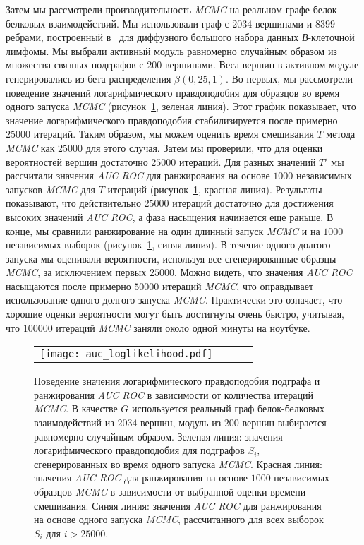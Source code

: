 Затем мы рассмотрели производительность \emph{MCMC} на реальном графе
белок-белковых взаимодействий.  Мы использовали граф с $2034$ вершинами
и $8399$ ребрами, построенный в~\cite{Dittrich2008a} для диффузного большого
набора данных \emph{В}-клеточной лимфомы.  Мы выбрали активный модуль
равномерно случайным образом из множества связных подграфов с $200$ вершинами.
Веса вершин в активном модуле генерировались из бета-распределения $\beta(0,25,
1)$.  Во-первых, мы рассмотрели поведение значений логарифмического
правдоподобия для образцов во время одного запуска \emph{MCMC}
(рисунок~\ref{fig:auclog}, зеленая линия).  Этот график показывает, что
значение логарифмического правдоподобия стабилизируется после примерно $25000$
итераций.  Таким образом, мы можем оценить время смешивания $T$ метода
\emph{MCMC} как $25000$ для этого случая.  Затем мы проверили, что для оценки
вероятностей вершин достаточно $25000$ итераций.  Для разных значений $T'$ мы
рассчитали значения \emph{AUC ROC} для ранжирования на основе $1000$ независимых
запусков \emph{MCMC} для $T$ итераций (рисунок~\ref{fig:auclog}, красная
линия).  Результаты показывают, что действительно $25000$ итераций достаточно
для достижения высоких значений \emph{AUC ROC}, а фаза насыщения начинается еще
раньше.  В конце, мы сравнили ранжирование на один длинный запуск \emph{MCMC}
и на $1000$ независимых выборок (рисунок~\ref{fig:auclog}, синяя линия).
В течение одного долгого запуска мы оценивали вероятности, используя все
сгенерированные образцы \emph{MCMC}, за исключением первых $25000$.  Можно
видеть, что значения \emph{AUC ROC} насыщаются после примерно $50000$ итераций
\emph{MCMC}, что оправдывает использование одного долгого запуска \emph{MCMC}.
Практически это означает, что хорошие оценки вероятности могут быть достигнуты
очень быстро, учитывая, что $100000$ итераций \emph{MCMC} заняли около одной
минуты на ноутбуке.

\begin{figure}
    \centering
    \begin{tabular}{@{}cccc@{}}
        \texttt{[image: auc\_loglikelihood.pdf]}
    \end{tabular}
    \caption{
        Поведение значения логарифмического правдоподобия подграфа
        и ранжирования \emph{AUC ROC} в зависимости от количества итераций
        \emph{MCMC}.  В качестве $G$ используется реальный граф белок-белковых
        взаимодействий из $2034$ вершин, модуль из $200$ вершин выбирается
        равномерно случайным образом.  Зеленая линия: значения логарифмического
        правдоподобия для подграфов $S_i$, сгенерированных во время одного
        запуска \emph{MCMC}.  Красная линия: значения \emph{AUC ROC} для
        ранжирования на основе $1000$ независимых образцов \emph{MCMC}
        в зависимости от выбранной оценки времени смешивания.  Синяя линия:
        значения \emph{AUC ROC} для ранжирования на основе одного запуска
        \emph{MCMC}, рассчитанного для всех выборок $S_i$ для $i > 25000$.
    }%
    \label{fig:auclog}%
\end{figure}

